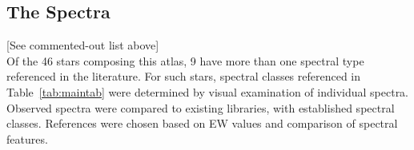 \subsection{The Spectra}

\iffalse
	{\bf List of stars with multiple spectral type references in literature with notes:}\\
	\begin{itemize}
		\item{} CD-25 11942
		\item{}~~~match isn't great

		\item{} GSC 06213-00306AB
		\item{}~~~missing exact match in comparison plot

		\item{} GSC 06793-00797
		\item{}~~~match isn't great

		\item{} GSC 06793-01406
		\item{}~~~missing exact match in comparison plot

		\item{} GSC 06801-00186
		\item{}~~~missing exact match in comparison plot

		\item{} HIP 78977
		\item{}~~~could be F7 or F8

		\item{} HIP 79369
		\item{}~~~could be F1 or F0

		\item{} ScoPMS 44
		\item{}~~~match isn't great

		\item{} ScoPMS 214
		\item{}~~~match isn't great
	\end{itemize}
\fi

[See commented-out list above]\\


Of the 46 stars composing this atlas, 9 have more than one spectral type 
referenced in the literature.   For such stars, spectral classes referenced 
in Table~\ref{tab:maintab} were determined by visual examination of individual 
spectra.  Observed spectra were compared to existing libraries, with established 
spectral classes.  References were chosen based on EW values and comparison of 
spectral features.
